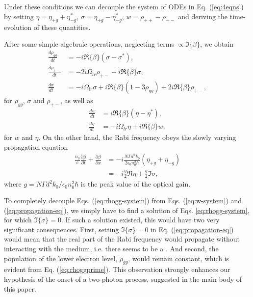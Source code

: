 \documentclass[preprint,secnumarabic,amssymb, nobibnotes, aip, prd]{revtex4-1}
\def\p{\partial}
\begin{document}
Under these conditions we can decouple the system of ODEs in Eq. (\ref{eq:4eqns}) by setting $\eta = \eta_{+g}+\eta_{-g}^*$, $\sigma = \eta_{+g}-\eta_{-g}^*$, $w = \rho_{++}-\rho_{--}$ and deriving the time-evolution of these quantities.

After some simple algebraic operations, neglecting terms $\propto \Im \{\beta\}$, we obtain
\begin{subequations}
	\label{eq:rhogg-system}
	\begin{align}
	\frac{d \rho_{gg}}{dt} &= - i\Re\{\beta\}(\sigma-\sigma^*), \label{eq:rhoggprime} \\
	\frac{d \rho_{+-}}{dt} &= -2i\Omega_{lr}\rho_{+-}+i\Re\{\beta\}\sigma,\\
	\frac{d \sigma}{dt} &= -i\Omega_{lr}\sigma+i\Re\{\beta\}(1-3\rho_{gg})+2i\Re\{\beta\}\rho_{+-},
	\end{align}
\end{subequations}
for $\rho_{gg}$, $\sigma$ and $\rho_{+-}$, as well as 
\begin{subequations}
\label{eq:w-system}
\begin{align}
\frac{d w}{dt} &= i\Re\{\beta\}(\eta-\eta^*), \\
\frac{d \eta}{dt} &= -i\Omega_{lr}\eta+i\Re\{\beta\} w, \label{eq:eta}
\end{align}
\end{subequations}
for $w$ and $\eta$. 
On the other hand, the Rabi frequency obeys the slowly varying propagation equation \cite{jirauschek2014modeling}
\begin{align}
\label{eq:propagation-eq}
\frac{n_0}{c}\frac{\p \beta}{\p t} + \frac{\p \beta}{\p x} &= - i\frac{N\Gamma d^2 k_0}{2\epsilon_0n_0^2\hbar}(\eta_{+g}+\eta_{-g}) \nonumber \\
		&=  -i\frac{g}{2}\Re{\eta}+\frac{g}{2}\Im{\sigma},
\end{align}
where $g =N\Gamma d^2 k_0/\epsilon_0n_0^2\hbar $ is the peak value of the optical gain. 

To completely decouple Eqs. (\ref{eq:rhogg-system}) from Eqs. (\ref{eq:w-system}) and (\ref{eq:propagation-eq}), we simply have to find a solution of Eqs. \ref{eq:rhogg-system}, for which $\Im\{\sigma\} =0$. If such a solution existed, this would have two very significant consequences. First, setting $\Im\{\sigma\} =0$ in Eq. (\ref{eq:propagation-eq}) would mean that the real part of the Rabi frequency would propagate without interacting with the medium, i.e. there seems to be a . And second, the population of the lower electron level, $\rho_{gg}$, would remain constant, which is evident from Eq. (\ref{eq:rhoggprime}). This observation strongly enhances our hypothesis of the onset of a two-photon process, suggested in the main body of this paper.
\end{document}

